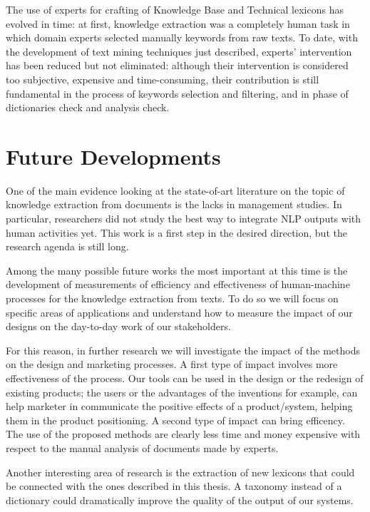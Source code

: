 \documentclass[b5paper,]{book}
\theoremstyle{definition}
\theoremstyle{definition}
\theoremstyle{definition}
\theoremstyle{remark}
\begin{document}
The use of experts for crafting of Knowledge Base and Technical lexicons
has evolved in time: at first, knowledge extraction was a completely
human task in which domain experts selected manually keywords from raw
texts. To date, with the development of text mining techniques just
described, experts' intervention has been reduced but not eliminated:
although their intervention is considered too subjective, expensive and
time-consuming, their contribution is still fundamental in the process
of keywords selection and filtering, and in phase of dictionaries check
and analysis check.

\chapter{Future Developments}\label{future-developments}

One of the main evidence looking at the state-of-art literature on the
topic of knowledge extraction from documents is the lacks in management
studies. In particular, researchers did not study the best way to
integrate NLP outputs with human activities yet. This work is a first
step in the desired direction, but the research agenda is still long.

Among the many possible future works the most important at this time is
the development of measurements of efficiency and effectiveness of
human-machine processes for the knowledge extraction from texts. To do
so we will focus on specific areas of applications and understand how to
measure the impact of our designs on the day-to-day work of our
stakeholders.

For this reason, in further research we will investigate the impact of
the methods on the design and marketing processes. A first type of
impact involves more effectiveness of the process. Our tools can be used
in the design or the redesign of existing products; the users or the
advantages of the inventions for example, can help marketer in
communicate the positive effects of a product/system, helping them in
the product positioning. A second type of impact can bring efficency.
The use of the proposed methods are clearly less time and money
expensive with respect to the manual analysis of documents made by
experts.

Another interesting area of research is the extraction of new lexicons
that could be connected with the ones described in this thesis. A
taxonomy instead of a dictionary could dramatically improve the quality
of the output of our systems.
\end{document}
